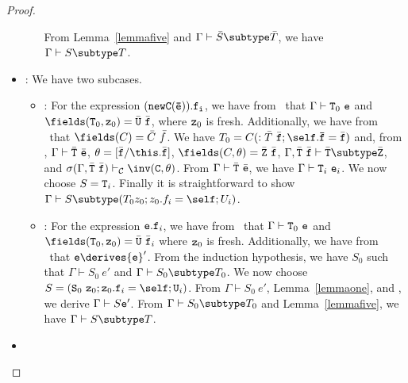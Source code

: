 \begin{proof}
\begin{itemize}
\begin{itemize}
            From Lemma~\ref{lemmafive} and
            $\Gamma \vdash \bar{S} \subtype \bar{T}$, we have
            $\Gamma \vdash S \subtype T$.
   \end{itemize}
\item
\TField: We have two subcases.
   \begin{itemize}
   \item
   \RField:  For the expression ${\tt (new C(\bar{e})).f_i}$, 
             we have from \TField\ that
             $\Gamma \vdash {\tt T}_0\ {\tt e}$ and
             $\fields({\tt T}_0,{\tt z}_0) = \bar{\tt U}\ \bar{\tt f}$, where
             ${\tt z}_0$ is fresh.
             Additionally, we have from \RField\ that
             $\fields(C)=\bar{C}\ \bar{f}$.
             We have 
             $T_0 = C(:\bar{T}\ \bar{\tt f}{\tt ;\self.\bar{f}}=\bar{\tt f})$
             and, from \TNew, 
             $\Gamma \vdash \bar{\tt T}\ \bar{\tt e}$,
             $\theta=[\bar{\tt f}/\this.\bar{\tt f}]$,
             $\fields(C,\theta)=\bar{\tt Z}\ \bar{\tt f}$,
             $\Gamma, \bar{\tt T}\ \bar{\tt f} \vdash 
                   \bar{\tt T} \subtype \bar{\tt Z}$, and
             $\sigma(\Gamma, \bar{\tt T}\ \bar{\tt f}) \vdash_{\cal C} 
                   \inv({\tt C},\theta)$.
             From $\Gamma \vdash \bar{\tt T}\ \bar{\tt e}$, we have
             $\Gamma \vdash {\tt T}_i\ {\tt e}_i$.
             We now choose $S = {\tt T}_i$.
             Finally it is straightforward to show
             $\Gamma \vdash S \subtype (T_0 z_0; z_0.f_i = \self; U_i)$.
   \item
   \RCField: For the expression ${\tt e.f}_i$, we have from \TField\ that
             $\Gamma \vdash {\tt T}_0\ {\tt e}$ and
             $\fields({\tt T}_0,{\tt z}_0)= \bar{\tt U}\ \bar{\tt f}_i$
             where ${\tt z}_0$ is fresh.
             Additionally, we have from \RCField\ that  
             ${\tt e} \derives {{\tt e}}'$.
             From the induction hypothesis, we have $S_0$ such that 
             $\Gamma \vdash S_0\ e'$ and $\Gamma \vdash S_0 \subtype T_0$.
             We now choose 
             $S = 
               ({\tt S}_0\ {\tt z}_0; {\tt z}_0.{\tt f}_i=\self;{\tt U}_i)$.
             From $\Gamma \vdash S_0\ e'$, Lemma~\ref{lemmaone}, and
             \TField, we derive
             $\Gamma \vdash S {{\tt e}}'$.
             From $\Gamma \vdash S_0 \subtype T_0$ and 
             Lemma~\ref{lemmafive}, we have $\Gamma \vdash S \subtype T$.
   \end{itemize}
\item

\end{itemize}
\end{proof}
